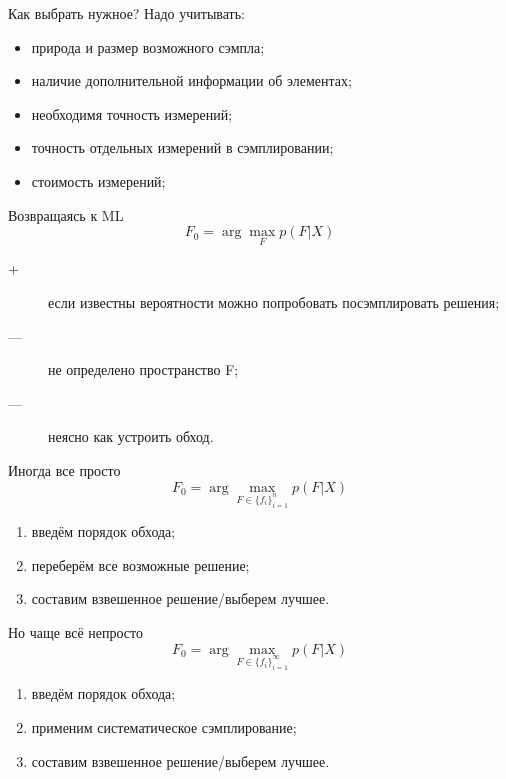 \documentclass[14pt, fleqn, xcolor={dvipsnames, table}]{beamer}
\begin{document}
\begin{frame}{Как выбрать нужное?}
Надо учитывать:
\begin{itemize}
   \item природа и размер возможного сэмпла;
   \item наличие дополнительной информации об элементах;
   \item необходимя точность измерений;
   \item точность отдельных измерений в сэмплировании;
   \item стоимость измерений;
\end{itemize}
\end{frame}

\begin{frame}{Возвращаясь к ML}
$$
F_0 = \arg\max_F p(F|X)
$$
\begin{description}
  \item[\color{green}+] если известны вероятности можно попробовать посэмплировать решения;
  \item[\color{red}---] не определено пространство F;
  \item[\color{red}---] неясно как устроить обход.
\end{description}
\end{frame}

\begin{frame}{Иногда все просто}
$$
F_0 = \arg\max_{F \in \{f_i\}_{i=1}^n} p(F|X)
$$
\begin{enumerate}
  \item введём порядок обхода;
  \item переберём все возможные решение;
  \item составим взвешенное решение/выберем лучшее.
\end{enumerate}
\end{frame}

\begin{frame}{Но чаще всё непросто}
$$
F_0 = \arg\max_{F \in \{f_i\}_{i=1}^\infty} p(F|X)
$$
\begin{enumerate}
  \item введём порядок обхода;
  \item применим систематическое сэмплирование;
  \item составим взвешенное решение/выберем лучшее.
\end{enumerate}
\end{frame}
\end{document}
